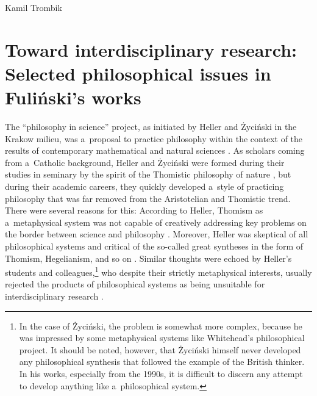 \begin{artengenv}{Kamil Trombik}
\section*{Toward interdisciplinary research: Selected philosophical issues in Fuliński's works}

The ``philosophy in science'' project, as initiated by Heller and Życiński in the Krakow milieu, was a~proposal to practice philosophy within the context of the results of contemporary mathematical and natural sciences 
\parencites[][]{heller_how_2019}[][]{polak_philosophy_2019}. %
 As scholars coming from a~Catholic background, Heller and Życiński were formed during their studies in seminary by the spirit of the Thomistic philosophy of nature 
\parencite[e.g][p.107]{heller_wierze_2016}, %
 but during their academic careers, they quickly developed a~style of practicing philosophy that was far removed from the Aristotelian and Thomistic trend. There were several reasons for this: According to Heller, Thomism as a~metaphysical system was not capable of creatively addressing key problems on the border between science and philosophy 
\parencite[][]{janik_nowa_1990}. %
 Moreover, Heller was skeptical of all philosophical systems and critical of the so-called great syntheses in the form of Thomism, Hegelianism, and so on 
\parencites[see e.g.,][pp.139–146]{heller_filozofia_2004}[][pp.92–95]{heller_philosophy_2011}. %
 Similar thoughts were echoed by Heller's students and colleagues,\footnote{In the case of Życiński, the problem is somewhat more complex, because he was impressed by some metaphysical systems like Whitehead's philosophical project. It should be noted, however, that Życiński himself never developed any philosophical synthesis that followed the example of the British thinker. In his works, especially from the 1990s, it is difficult to discern any attempt to develop anything like a~philosophical system.} who despite their strictly metaphysical interests, usually rejected the products of philosophical systems as being unsuitable for interdisciplinary research 
\parencite[see][]{polak_krakow_2022}.%





\end{artengenv}
